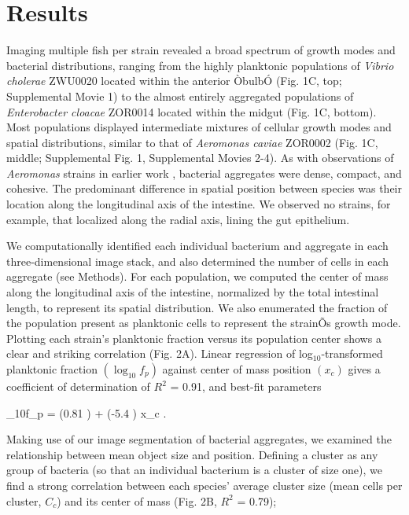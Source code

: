  \section{Results}




Imaging multiple fish per strain revealed a broad spectrum of growth modes and bacterial distributions, ranging from the highly planktonic populations of \textit{Vibrio cholerae} ZWU0020 located within the anterior ÒbulbÓ (Fig. 1C, top; Supplemental Movie 1) to the almost entirely aggregated populations of \textit{Enterobacter cloacae} ZOR0014 located within the midgut (Fig. 1C, bottom). Most populations displayed intermediate mixtures of cellular growth modes and spatial distributions, similar to that of \textit{Aeromonas caviae} ZOR0002 (Fig. 1C, middle; Supplemental Fig. 1, Supplemental Movies 2-4). As with observations of \textit{Aeromonas} strains in earlier work \cite{Wiles2016}, bacterial aggregates were dense, compact, and cohesive. The predominant difference in spatial position between species was their location along the longitudinal axis of the intestine. We observed no strains, for example, that localized along the radial axis, lining the gut epithelium.	

We computationally identified each individual bacterium and aggregate in each three-dimensional image stack, and also determined the number of cells in each aggregate \cite{Jemielita2014} (see Methods). For each population, we computed the center of mass along the longitudinal axis of the intestine, normalized by the total intestinal length, to represent its spatial distribution. We also enumerated the fraction of the population present as planktonic cells to represent the strainÕs growth mode. Plotting each strain's planktonic fraction versus its population center shows a clear and striking correlation (Fig. 2A). Linear regression of log$_{10}$-transformed planktonic fraction $(\log_{10}f_p)$ against center of mass position $(x_c)$ gives a coefficient of determination of $R^2$ = 0.91, and best-fit parameters	

\be
        	 \log_{10}f_p = (0.81 ) + (-5.4 ) x_c .	
\ee

Making use of our image segmentation of bacterial aggregates, we examined the relationship between mean object size and position. Defining a cluster as any group of bacteria (so that an individual bacterium is a cluster of size one), we find a strong correlation between each species' average cluster size (mean cells per cluster, $C_c$) and its center of mass (Fig. 2B, $R^2$ = 0.79);

